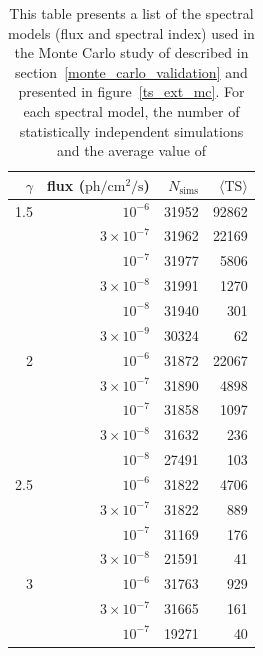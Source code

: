 \documentclass[12pt,preprint]{aastex}
\newcommand{\ph}{\text{ph}\xspace}
\newcommand{\cm}{\text{cm}\xspace}
\renewcommand{\sec}{\text{s}\xspace}
\newcommand{\ts}{\text{TS}\xspace}
\newcommand{\pointlike}{\text{\em pointlike}\xspace}
\begin{document}
    \begin{table}
  \begin{centering}
    \begin{tabular}{ r | r | r | r }
      \hline
      \hline
      $\gamma$ & flux ($\ph/\cm^2/\sec$) & $N_\text{sims}$ & $\langle\ts\rangle$ \\
      \hline
      1.5 &          $10^{-6}$ &           31952 &  92862 \\
      &  $3\times 10^{-7}$ &           31962 &  22169 \\
      &          $10^{-7}$ &           31977 &   5806 \\
      &  $3\times 10^{-8}$ &           31991 &   1270 \\
      &          $10^{-8}$ &           31940 &    301 \\
      &  $3\times 10^{-9}$ &           30324 &     62 \\
      \hline
      2 &          $10^{-6}$ &           31872 &  22067 \\
      &  $3\times 10^{-7}$ &           31890 &   4898 \\
      &          $10^{-7}$ &           31858 &   1097 \\
      &  $3\times 10^{-8}$ &           31632 &    236 \\
      &          $10^{-8}$ &           27491 &    103 \\
      \hline
      2.5 &          $10^{-6}$ &           31822 &   4706 \\
      &  $3\times 10^{-7}$ &           31822 &    889 \\
      &          $10^{-7}$ &           31169 &    176 \\
      &  $3\times 10^{-8}$ &           21591 &     41 \\
      \hline                                                
      3 &          $10^{-6}$ &           31763 &    929 \\
      &  $3\times 10^{-7}$ &           31665 &    161 \\
      &          $10^{-7}$ &           19271 &     40 \\
      \hline
    \end{tabular}
    \caption{
    This table presents a list of the spectral models (flux and
    spectral index) used in the Monte Carlo study of \pointlike
    described in section~\ref{monte_carlo_validation} and presented
    in figure~\ref{ts_ext_mc}.  For each spectral model, the number of
    statistically independent simulations and the average value of \ts
}
\end{centering}
\end{table}
\end{document}
